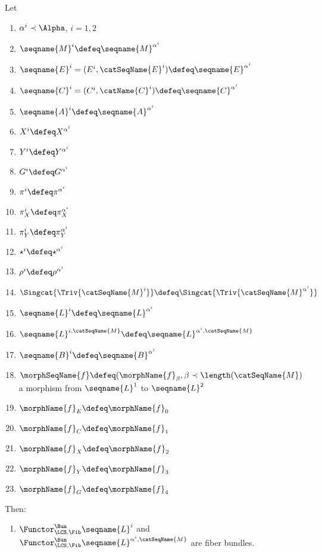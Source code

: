 \documentclass{article}
\begin{document}
\begin{theorem}
Let
\begin{enumerate}
\item $\alpha^i \prec \Alpha$, $i=1,2$
\item
$\seqname{M}^i \defeq \seqname{M}^{\alpha^i}$
\item
$\seqname{E}^i = (E^i,\catSeqName{E}^i) \defeq \seqname{E}^{\alpha^i}$
\item
$\seqname{C}^i = (C^i,\catName{C}^i) \defeq \seqname{C}^{\alpha^i}$
\item
$\seqname{A}^i \defeq \seqname{A}^{\alpha^i}$
\item
$X^i \defeq X^{\alpha^i}$
\item
$Y^i \defeq Y^{\alpha^i}$
\item
$G^i \defeq G^{\alpha^i}$
\item
$\pi^i \defeq \pi^{\alpha^i}$
\item
$\pi^i_X \defeq \pi^{\alpha^i}_X$
\item
$\pi^i_Y \defeq \pi^{\alpha^i}_Y$
\item
$\star^i \defeq \star^{\alpha^i}$
\item
$\rho^i \defeq \rho^{\alpha^i}$
\item
$
  \Singcat{\Triv{\catSeqName{M}^i}} \defeq
  \Singcat{\Triv{\catSeqName{M}^{\alpha^i}}}
$
\item
$\seqname{L}^i \defeq \seqname{L}^{\alpha^i}$
\item
$
  \seqname{L}^{i,\catSeqName{M}} \defeq
  \seqname{L}^{\alpha^i,\catSeqName{M}}
$
\item
$\seqname{B}^i \defeq \seqname{B}^{\alpha^i}$
\item
$
  \morphSeqName{f} \defeq
  (\morphName{f}_\beta, \beta \prec \length(\catSeqName{M})
$
a morphism from $\seqname{L}^1$ to $\seqname{L}^2$
\item
$\morphName{f}_E \defeq \morphName{f}_0$
\item
$\morphName{f}_C \defeq \morphName{f}_1$
\item
$\morphName{f}_X \defeq \morphName{f}_2$
\item
$\morphName{f}_Y \defeq \morphName{f}_3$
\item
$\morphName{f}_G \defeq \morphName{f}_4$
\end{enumerate}
Then:

\begin{enumerate}
\item
$\Functor^\Bun_{\LCS,\Fib} \seqname{L}^i$ and
$\Functor^\Bun_{\LCS,\Fib} \seqname{L}^{\alpha^i,\catSeqName{M}}$ are
fiber bundles.


\end{enumerate}
\end{theorem}
\end{document}
